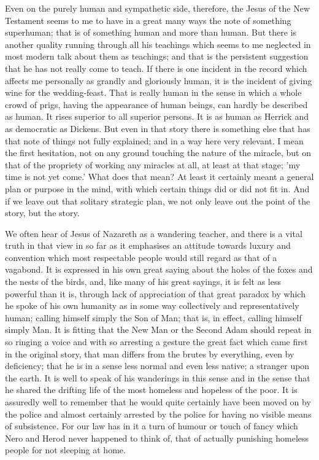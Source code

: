 Even on the purely human and sympathetic side, therefore, the Jesus of the New Testament seems to me to have in a great many ways the note of something superhuman; that is of something human and more than human. But there is another quality running through all his teachings which seems to me neglected in most modern talk about them as teachings; and that is the persistent suggestion that he has not really come to teach. If there is one incident in the record which affects me personally as grandly and gloriously human, it is the incident of giving wine for the wedding-feast. That is really human in the sense in which a whole crowd of prigs, having the appearance of human beings, can hardly be described as human. It rises superior to all superior persons. It is as human as Herrick and as democratic as Dickens. But even in that story there is something else that has that note of things not fully explained; and in a way here very relevant. I mean the first hesitation, not on any ground touching the nature of the miracle, but on that of the propriety of working any miracles at all, at least at that stage; 'my time is not yet come.' What does that mean? At least it certainly meant a general plan or purpose in the mind, with which certain things did or did not fit in. And if we leave out that solitary strategic plan, we not only leave out the point of the story, but the story.

We often hear of Jesus of Nazareth as a wandering teacher, and there is a vital truth in that view in so far as it emphasises an attitude towards luxury and convention which most respectable people would still regard as that of a vagabond. It is expressed in his own great saying about the holes of the foxes and the nests of the birds, and, like many of his great sayings, it is felt as less powerful than it is, through lack of appreciation of that great paradox by which he spoke of his own humanity as in some way collectively and representatively human; calling himself simply the Son of Man; that is, in effect, calling himself simply Man. It is fitting that the New Man or the Second Adam should repeat in so ringing a voice and with so arresting a gesture the great fact which came first in the original story, that man differs from the brutes by everything, even by deficiency; that he is in a sense less normal and even less native; a stranger upon the earth. It is well to speak of his wanderings in this sense and in the sense that he shared the drifting life of the most homeless and hopeless of the poor. It is assuredly well to remember that he would quite certainly have been moved on by the police and almost certainly arrested by the police for having no visible means of subsistence. For our law has in it a turn of humour or touch of fancy which Nero and Herod never happened to think of, that of actually punishing homeless people for not sleeping at home.

